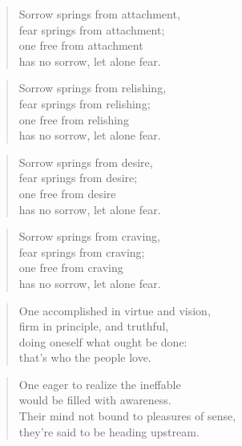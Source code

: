 \documentclass[12pt,openany]{book}%
\begin{document}
\begin{verse}%
Sorrow springs from attachment, \\
fear springs from attachment; \\
one free from attachment \\
has no sorrow, let alone fear. 

%
\end{verse}

\begin{verse}%
Sorrow springs from relishing, \\
fear springs from relishing; \\
one free from relishing \\
has no sorrow, let alone fear. 

%
\end{verse}

\begin{verse}%
Sorrow springs from desire, \\
fear springs from desire; \\
one free from desire \\
has no sorrow, let alone fear. 

%
\end{verse}

\begin{verse}%
Sorrow springs from craving, \\
fear springs from craving; \\
one free from craving \\
has no sorrow, let alone fear. 

%
\end{verse}

\begin{verse}%
One accomplished in virtue and vision, \\
firm in principle, and truthful, \\
doing oneself what ought be done: \\
that’s who the people love. 

%
\end{verse}

\begin{verse}%
One eager to realize the ineffable \\
would be filled with awareness. \\
Their mind not bound to pleasures of sense, \\
they’re said to be heading upstream. 

%
\end{verse}
\end{document}
